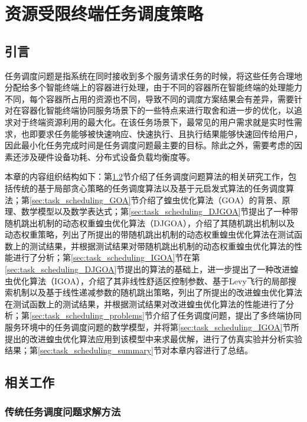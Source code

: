 \chapter{资源受限终端任务调度策略}\label{chap:task_scheduling}

\section{引言}

任务调度问题是指系统在同时接收到多个服务请求任务的时候，将这些任务合理地分配给多个智能终端上的容器进行处理，由于不同的容器所在智能终端的处理能力不同，每个容器所占用的资源也不同，导致不同的调度方案结果会有差异，需要针对在容器化智能终端协同服务场景下的一些特点来进行取舍和进一步的优化，以追求对于终端资源利用的最大化。在该任务场景下，最常见的用户需求就是实时性需求，也即要求任务能够被快速响应、快速执行、且执行结果能够快速回传给用户，因此最小化任务完成时间是任务调度问题最主要的目标。除此之外，需要考虑的因素还涉及硬件设备功耗、分布式设备负载均衡度等。

本章的内容组织结构如下：第\ref{sec:task_scheduling_related_work}节介绍了任务调度问题算法的相关研究工作，包括传统的基于局部贪心策略的任务调度算法以及基于元启发式算法的任务调度算法；第\ref{sec:task_scheduling_GOA}节介绍了蝗虫优化算法（GOA）的背景、原理、数学模型以及数学表达式；第\ref{sec:task_scheduling_DJGOA}节提出了一种带随机跳出机制的动态权重蝗虫优化算法（DJGOA），介绍了其随机跳出机制以及动态权重策略，列出了所提出的带随机跳出机制的动态权重蝗虫优化算法在测试函数上的测试结果，并根据测试结果对带随机跳出机制的动态权重蝗虫优化算法的性能进行了分析；第\ref{sec:task_scheduling_IGOA}节在第\ref{sec:task_scheduling_DJGOA}节提出的算法的基础上，进一步提出了一种改进蝗虫优化算法（IGOA），介绍了其非线性舒适区控制参数、基于Levy飞行的局部搜索机制以及基于线性递减参数的随机跳出策略，列出了所提出的改进蝗虫优化算法在测试函数上的测试结果，并根据测试结果对改进蝗虫优化算法的性能进行了分析；第\ref{sec:task_scheduling_problems}节介绍了任务调度问题，提出了多终端协同服务环境中的任务调度问题的数学模型，并将第\ref{sec:task_scheduling_IGOA}节所提出的改进蝗虫优化算法应用到该模型中来求最优解，进行了仿真实验并分析实验结果；第\ref{sec:task_scheduling_summary}节对本章内容进行了总结。

\section{相关工作}\label{sec:task_scheduling_related_work}

\subsection{传统任务调度问题求解方法}

